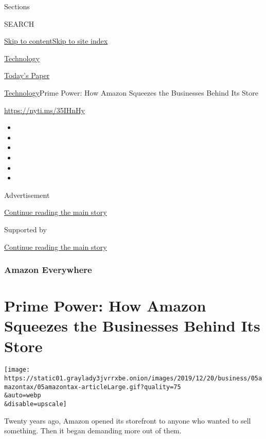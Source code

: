 Sections

SEARCH

\protect\hyperlink{site-content}{Skip to
content}\protect\hyperlink{site-index}{Skip to site index}

\href{https://www.nytimes3xbfgragh.onion/section/technology}{Technology}

\href{https://myaccount.nytimes3xbfgragh.onion/auth/login?response_type=cookie\&client_id=vi}{}

\href{https://www.nytimes3xbfgragh.onion/section/todayspaper}{Today's
Paper}

\href{/section/technology}{Technology}\textbar{}Prime Power: How Amazon
Squeezes the Businesses Behind Its Store

\url{https://nyti.ms/35IHnHy}

\begin{itemize}
\item
\item
\item
\item
\item
\item
\end{itemize}

Advertisement

\protect\hyperlink{after-top}{Continue reading the main story}

Supported by

\protect\hyperlink{after-sponsor}{Continue reading the main story}

\hypertarget{amazon-everywhere}{%
\subsubsection{Amazon Everywhere}\label{amazon-everywhere}}

\hypertarget{prime-power-how-amazon-squeezes-the-businesses-behind-its-store}{%
\section{Prime Power: How Amazon Squeezes the Businesses Behind Its
Store}\label{prime-power-how-amazon-squeezes-the-businesses-behind-its-store}}

\texttt{[image: https://static01.graylady3jvrrxbe.onion/images/2019/12/20/business/05amazontax/05amazontax-articleLarge.gif?quality=75\\\&auto=webp\\\&disable=upscale]}

Twenty years ago, Amazon opened its storefront to anyone who wanted to
sell something. Then it began demanding more out of them.

